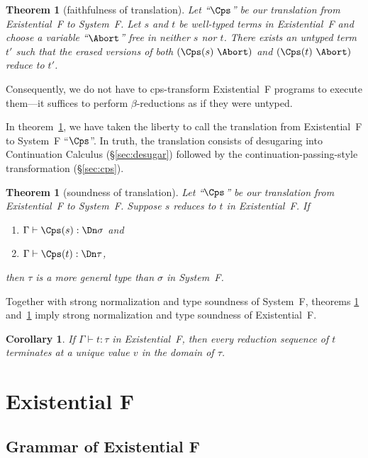 \documentclass{amsart}
\newtheorem{theorem}[subsection]{Theorem}
\newtheorem{corollary}[subsection]{Corollary}
\begin{document}
\begin{theorem}
[faithfulness of translation]
\label{thm:faith}
Let ``$\Cps$'' be our translation from Existential~F to System~F.
Let $s$ and $t$ be well-typed terms in Existential~F and choose a
variable ``$\Abort$'' free in neither $s$ nor $t$. There exists
an untyped term $t'$ such that the erased versions of both
$(\Cps(s)~\Abort)$ and $(\Cps(t)~\Abort)$ reduce to $t'$.
\end{theorem}

Consequently, we do not have to cps-transform Existential~F
programs to execute them---it suffices to perform
$\beta$-reductions as if they were untyped.

In theorem~\ref{thm:faith}, we have taken the liberty to
call the translation from Existential~F to System~F ``$\Cps$''.
In truth, the translation consists of desugaring into
Continuation Calculus (\S\ref{sec:desugar}) followed by
the continuation-passing-style transformation (\S\ref{sec:cps}).

\begin{theorem}
[soundness of translation]
\label{thm:sound}
Let ``$\Cps$'' be our translation from Existential~F to System~F.
Suppose $s$ reduces to $t$ in Existential~F. If
\begin{enumerate}
\item $\Gamma\vdash\Cps(s):\Dn\sigma$ and\/
\item $\Gamma\vdash\Cps(t):\Dn\tau$,
\end{enumerate}
then $\tau$ is a more general type than $\sigma$ in System~F.
\end{theorem}

Together with strong normalization and type soundness of
System~F, theorems \ref{thm:faith} and~\ref{thm:sound} imply
strong normalization and type soundness of Existential~F.

\begin{corollary}
\label{cor:sound}
If\/ $\Gamma\vdash t:\tau$ in Existential~F, then every reduction
sequence of $t$ terminates at a unique value $v$ in the
domain of $\tau$.
\end{corollary}

\section{Existential F}

\subsection{Grammar of Existential F}
\end{document}
